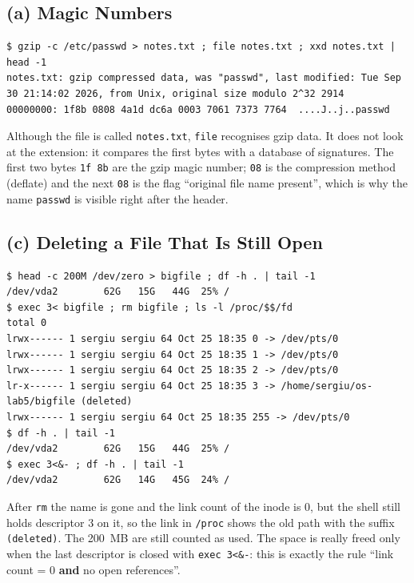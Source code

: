 \documentclass[12pt,a4paper]{article}
\begin{document}
\subsection{(a) Magic Numbers}

\begin{lstlisting}[style=terminal,caption={The type is in the content, not in the name}]
$ gzip -c /etc/passwd > notes.txt ; file notes.txt ; xxd notes.txt | head -1
notes.txt: gzip compressed data, was "passwd", last modified: Tue Sep 30 21:14:02 2026, from Unix, original size modulo 2^32 2914
00000000: 1f8b 0808 4a1d dc6a 0003 7061 7373 7764  ....J..j..passwd
\end{lstlisting}
Although the file is called \texttt{notes.txt}, \texttt{file} recognises gzip data. It does not look at the extension: it compares the first bytes with a database of signatures. The first two bytes \texttt{1f 8b} are the gzip magic number; \texttt{08} is the compression method (deflate) and the next \texttt{08} is the flag ``original file name present'', which is why the name \texttt{passwd} is visible right after the header.

\subsection{(c) Deleting a File That Is Still Open}

\begin{lstlisting}[style=terminal,caption={A deleted but still open file keeps its space}]
$ head -c 200M /dev/zero > bigfile ; df -h . | tail -1
/dev/vda2        62G   15G   44G  25% /
$ exec 3< bigfile ; rm bigfile ; ls -l /proc/$$/fd
total 0
lrwx------ 1 sergiu sergiu 64 Oct 25 18:35 0 -> /dev/pts/0
lrwx------ 1 sergiu sergiu 64 Oct 25 18:35 1 -> /dev/pts/0
lrwx------ 1 sergiu sergiu 64 Oct 25 18:35 2 -> /dev/pts/0
lr-x------ 1 sergiu sergiu 64 Oct 25 18:35 3 -> /home/sergiu/os-lab5/bigfile (deleted)
lrwx------ 1 sergiu sergiu 64 Oct 25 18:35 255 -> /dev/pts/0
$ df -h . | tail -1
/dev/vda2        62G   15G   44G  25% /
$ exec 3<&- ; df -h . | tail -1
/dev/vda2        62G   14G   45G  24% /
\end{lstlisting}
After \texttt{rm} the name is gone and the link count of the inode is 0, but the shell still holds descriptor 3 on it, so the link in \texttt{/proc} shows the old path with the suffix \texttt{(deleted)}. The 200~MB are still counted as used. The space is really freed only when the last descriptor is closed with \texttt{exec 3<\&-}: this is exactly the rule ``link count = 0 \textbf{and} no open references''.
\end{document}
